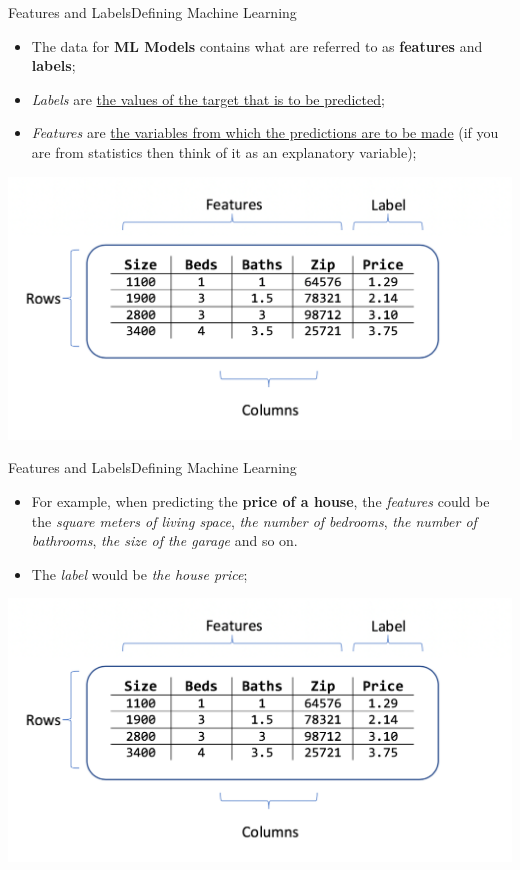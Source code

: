 \documentclass[11pt]{beamer}
\begin{document}
\begin{frame}{Features and Labels}{Defining Machine Learning}
	\begin{itemize}
		\item The data for \textbf{ML Models} contains what are referred to as \textbf{features} and \textbf{labels};
		\item \textit{Labels} are \ul{the values of the target that is to be predicted};
		\item \textit{Features} are \ul{the variables from which the predictions are to be made} (if you are from statistics then think of it as an explanatory variable);
	\end{itemize}
\begin{center}
\includegraphics[scale=.3]{../05-pictures/lesson-1-1_pic_6.png} 
\end{center}	
	
\end{frame}
\begin{frame}{Features and Labels}{Defining Machine Learning}
	\begin{itemize}
		\item For example, when predicting the \textbf{price of a house}, the \textit{features} could be the \textit{square meters of living space}, \textit{the number of bedrooms}, \textit{the number of bathrooms}, \textit{the size of the garage} and so on. 
		\item The \textit{label} would be \textit{the house price};  
	\end{itemize}
\begin{center}
\includegraphics[scale=.35]{../05-pictures/lesson-1-1_pic_7.png} 
\end{center}	
\end{frame}
\end{document}
